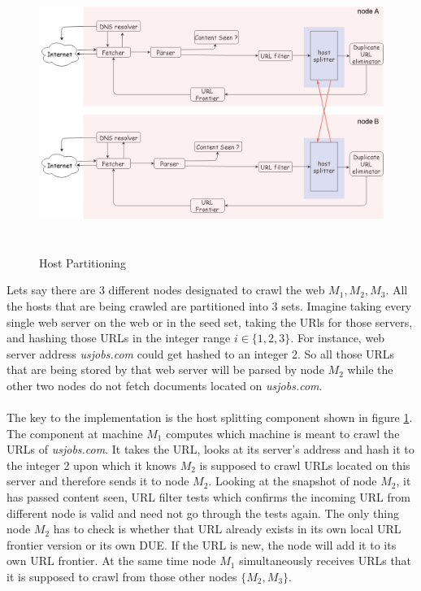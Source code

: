 \begin{figure}[h!]
  \centering
  \includegraphics[width=15cm,height=9cm,keepaspectratio]{../media/crawler/host-splitterv3.png}
  \caption{Host Partitioning \cite{mercator}}
  \label{fig:hpart}
\end{figure}

\noindent
Lets say there are 3 different nodes designated to crawl the web $M_1, M_2, M_3$. All
the hosts that are being crawled are partitioned into 3 sets. Imagine taking every
single web server on the web or in the seed set, taking the URls for those servers, and hashing those URLs in the integer range $i \in \{1,2,3\}$. For instance, web
server address \textit{usjobs.com} could get hashed to an integer 2. So all those URLs that are being stored by that web server will be parsed by node $M_2$ while the other two nodes do not fetch documents located on \textit{usjobs.com}.
\\
\\
The key to the implementation is the host splitting\cite{mercator} component shown in figure \ref{fig:hpart}. The component at machine $M_1$ computes which machine is meant to crawl
the URLs of \textit{usjobs.com}. It takes the URL, looks at its server's address and
hash it to the integer 2 upon which it knows $M_2$ is supposed to crawl URLs located
on this server and therefore sends it to node $M_2$. Looking at the snapshot of node $M_2$, it has passed content seen, URL filter tests which confirms the incoming URL
from different node is valid and need not go through the tests again. The only thing node $M_2$ has to check is whether that URL already exists in its own local URL frontier version or its own DUE. If the URL is new, the node will add it to its own URL
frontier. At the same time node $M_1$ simultaneously receives URLs that it is supposed to crawl from those other nodes $\{M_2, M_3\}$.

\pagebreak